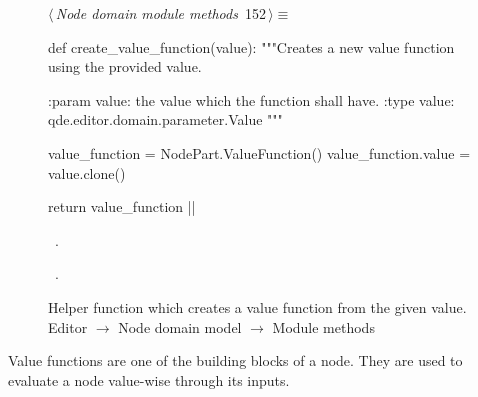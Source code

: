 \documentclass[%
    a4paper,    %
    justified,  %
    nobib,      %
    openany     %
]{tufte-book}
\makeatletter
\renewcommand{\label}[1]{\@tufte@label{##1}}%
\makeatother
\begin{document}
\begin{figure}[!htbp]
\begin{flushleft} \small
\begin{minipage}{\linewidth}\label{scrap111}\raggedright\small
{} $\langle\,${\itshape Node domain module methods}\nobreak\ {\footnotesize {152}}$\,\rangle\equiv$
\vspace{-1ex}
\begin{pythoncode}
def create_value_function(value):
    """Creates a new value function using the provided value.

    :param value: the value which the function shall have.
    :type  value: qde.editor.domain.parameter.Value
    """

    value_function = NodePart.ValueFunction()
    value_function.value = value.clone()

    return value_function
|\NWsep|
\end{pythoncode}
\vspace{1.5ex}
\footnotesize
\begin{list}{}{\setlength{\itemsep}{-\parsep}\setlength{\itemindent}{-\leftmargin}}
\item \NWtxtMacroDefBy\ .
\item \NWtxtMacroRefIn\ .

\item{}
\end{list}
\end{minipage}\vspace{4ex}
\end{flushleft}
\caption{Helper function which creates a value function from the given value.
  \newline{}\newline{}Editor $\rightarrow$ Node domain model $\rightarrow$
  Module methods}
\end{figure}

 Value functions are
one of the building blocks of a node. They are used to evaluate a node
value-wise through its inputs.
\end{document}
